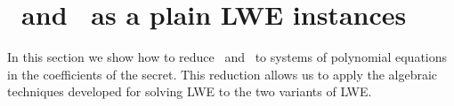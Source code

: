 


\section{\rlwe\ and \mlwe\ as a plain LWE instances}
\label{sec:lwe_types_reduction}
In this section we show how to reduce \rlwe\ and \mlwe\ to systems of polynomial equations in the coefficients of the secret. This reduction allows us to apply the algebraic techniques developed for solving LWE to the two variants of LWE.


